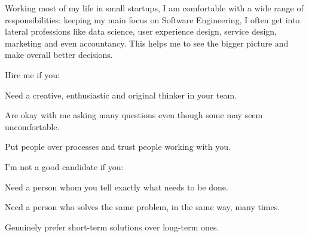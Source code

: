 


\begin{cvparagraph}

Working most of my life in small startups, I am comfortable with a wide range of responsibilities: keeping my main focus on Software Engineering, I often get into lateral professions like data science, user experience design, service design, marketing and even accountancy. This helps me to see the bigger picture and make overall better decisions.

Hire me if you:

\begin{cvlistitems}
  \item Need a creative, enthusiastic and original thinker in your team.
  \item Are okay with me asking many questions even though some may seem uncomfortable.
  \item Put people over processes and trust people working with you.
\end{cvlistitems}

I’m not a good candidate if you:

\begin{cvlistitems}
  \item Need a person whom you tell exactly what needs to be done.
  \item Need a person who solves the same problem, in the same way, many times.
  \item Genuinely prefer short-term solutions over long-term ones.
\end{cvlistitems}

\end{cvparagraph}
